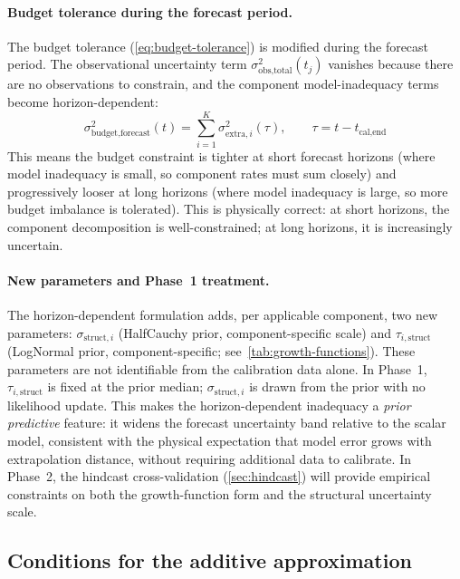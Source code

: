 \documentclass[11pt]{article}
\begin{document}
\paragraph{Budget tolerance during the forecast period.}
The budget tolerance (\cref{eq:budget-tolerance}) is modified during the forecast period.  The observational uncertainty term $\sigma_{\text{obs,total}}^2(t_j)$ vanishes because there are no observations to constrain, and the component model-inadequacy terms become horizon-dependent:
\begin{equation}
  \sigma_{\text{budget,forecast}}^2(t) = \sum_{i=1}^{K} \sigma_{\text{extra},i}^2(\tau), \qquad \tau = t - t_{\text{cal,end}}
  \label{eq:budget-tolerance-forecast}
\end{equation}
This means the budget constraint is tighter at short forecast horizons (where model inadequacy is small, so component rates must sum closely) and progressively looser at long horizons (where model inadequacy is large, so more budget imbalance is tolerated).  This is physically correct: at short horizons, the component decomposition is well-constrained; at long horizons, it is increasingly uncertain.

\paragraph{New parameters and Phase~1 treatment.}
The horizon-dependent formulation adds, per applicable component, two new parameters: $\sigma_{\text{struct},i}$ (HalfCauchy prior, component-specific scale) and $\tau_{i,\text{struct}}$ (LogNormal prior, component-specific; see~\cref{tab:growth-functions}).  These parameters are not identifiable from the calibration data alone.  In Phase~1, $\tau_{i,\text{struct}}$ is fixed at the prior median; $\sigma_{\text{struct},i}$ is drawn from the prior with no likelihood update.  This makes the horizon-dependent inadequacy a \emph{prior predictive} feature: it widens the forecast uncertainty band relative to the scalar model, consistent with the physical expectation that model error grows with extrapolation distance, without requiring additional data to calibrate.  In Phase~2, the hindcast cross-validation (\cref{sec:hindcast}) will provide empirical constraints on both the growth-function form and the structural uncertainty scale.

\subsection{Conditions for the additive approximation}
\label{sec:variance-approx}
\end{document}
